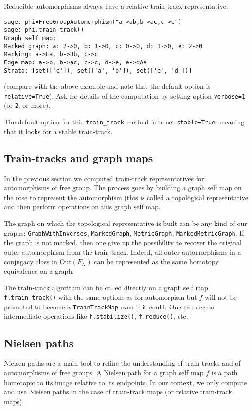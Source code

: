 \documentclass[10pt,a4paper]{article}
\newcommand{\Out}{\text{Out}}
\newcommand{\FN}{F_N}
\begin{document}
Reducible automorphisms always have a relative train-track
representative.
\begin{verbatim}
sage: phi=FreeGroupAutomorphism("a->ab,b->ac,c->c")
sage: phi.train_track()
Graph self map:
Marked graph: a: 2->0, b: 1->0, c: 0->0, d: 1->0, e: 2->0
Marking: a->Ea, b->Db, c->c
Edge map: a->b, b->ac, c->c, d->e, e->dAe
Strata: [set(['c']), set(['a', 'b']), set(['e', 'd'])]
\end{verbatim}
(compare with the above example and note that the default option is
\texttt{relative=True}). Ask for details of the computation by setting
option \texttt{verbose=1} (or \texttt{2}, or more).

The default option for this \texttt{train\_track} method is to set
\texttt{stable=True}, meaning that it looks for a stable
train-track.

\subsection{Train-tracks and graph maps}

In the previous section we computed train-track representatives for
automorphisms of free group. The process goes by building a graph self
map on the rose to represent the automorphism (this is called a
topological representative and then
perform operations on this graph self map.

The graph on which the topological representative is built can be any
kind of our graphs: \texttt{GraphWithInverses}, \texttt{MarkedGraph},
\texttt{MetricGraph}, \texttt{MarkedMetricGraph}. If the graph is not
marked, then one give up the possibility to recover the original outer
automorphism from the train-track. Indeed, all outer automorphisms in
a conjugacy class in $\Out(\FN)$
can be represented as the same homotopy equivalence on a graph. 

The train-track algorithm can be called directly on a graph self map
\texttt{f.train\_track()} with the same options as for automorpism but
$f$
will not be promoted to become a \texttt{TrainTrackMap} even if it
could. One can access intermediate operations like
\texttt{f.stabilize()}, \texttt{f.reduce()}, etc.

\subsection{Nielsen paths}

Nielsen paths are a main tool to refine the understanding of
train-tracks and of automorphisms of free groups. A Nielsen
path for a graph self map $f$
is a path homotopic to its image relative to its endpoints. In our
context, we only compute and use Nielsen paths in the case of
train-track maps (or relative train-track maps).
\end{document}
